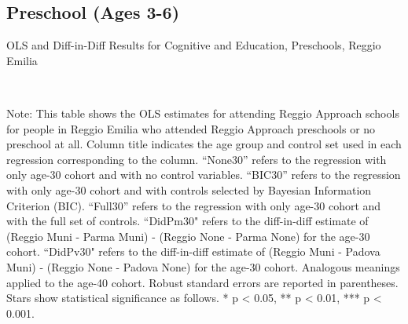 \begin{landscape}
\subsection{Preschool (Ages 3-6)}

\begin{table}[H] \caption{OLS and Diff-in-Diff Results for Cognitive and Education, Preschools, Reggio Emilia} \label{ols-E-reg}
\scalebox{0.85}{}
\vspace{1ex} \\
\footnotesize\raggedright{Note: This table shows the OLS estimates for attending Reggio Approach schools for people in Reggio Emilia who attended Reggio Approach preschools or no preschool at all. Column title indicates the age group and control set used in each regression corresponding to the column. ``None30'' refers to the regression with only age-30 cohort and with no control variables. ``BIC30'' refers to the regression with only age-30 cohort and with controls selected by Bayesian Information Criterion (BIC). ``Full30'' refers to the regression with only age-30 cohort and with the full set of controls. ``DidPm30" refers to the diff-in-diff estimate of (Reggio Muni - Parma Muni) - (Reggio None - Parma None) for the age-30 cohort. ``DidPv30" refers to the diff-in-diff estimate of (Reggio Muni - Padova Muni) - (Reggio None - Padova None) for the age-30 cohort. Analogous meanings applied to the age-40 cohort. Robust standard errors are reported in parentheses. Stars show statistical significance as follows. * p < 0.05, ** p < 0.01, *** p < 0.001.}
\end{table}



\end{landscape}
